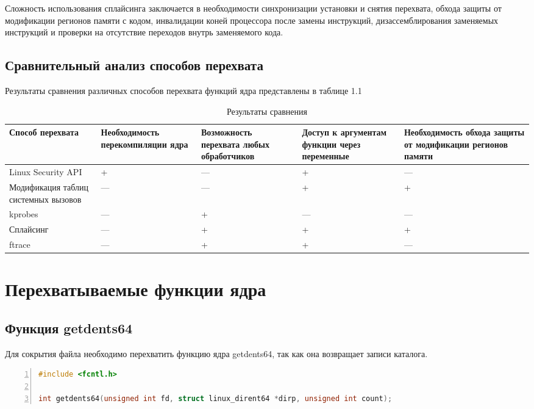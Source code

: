 Сложность использования сплайсинга заключается в необходимости синхронизации установки и снятия перехвата, обхода защиты от модификации регионов памяти с кодом, инвалидации коней процессора после замены инструкций, дизассемблирования заменяемых инструкций и проверки на отсутствие переходов внутрь заменяемого кода.

\subsection{Сравнительный анализ способов перехвата}

Результаты сравнения различных способов перехвата функций ядра представлены в таблице 1.1

\begin{table}[h]
	\centering
	\caption{Результаты сравнения}
	\begin{tabular}{|p{3cm}|p{3cm}|p{3cm}|p{3cm}|p{3cm}|}
		\hline
		Способ перехвата & Необходимость перекомпиляции ядра & Возможность перехвата любых обработчиков & Доступ к аргументам функции через переменные & Необходимость обхода защиты от модификации регионов памяти \\
		\hline
		Linux Security API & + & --- & + & --- \\
		\hline
		Модификация таблиц системных вызовов & --- & --- & + & + \\
		\hline
		kprobes & --- & + & --- & --- \\
		\hline
		Сплайсинг & --- & + & + & + \\
		\hline
		ftrace & --- & + & + & --- \\
		\hline
	\end{tabular}
\end{table}

\section{Перехватываемые функции ядра}

\subsection{Функция getdents64}

Для сокрытия файла необходимо перехватить функцию ядра getdents64, так как она возвращает записи каталога.

\begin{lstlisting}[language=C, frame=single, numbers=left, caption={Функция getdents64}]
#include <fcntl.h>

int getdents64(unsigned int fd, struct linux_dirent64 *dirp, unsigned int count);
\end{lstlisting}


